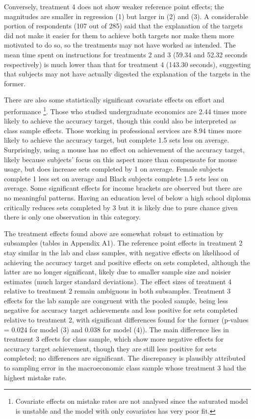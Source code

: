 \documentclass[
  12,
  letterpaper,
  DIV=11,
  numbers=noendperiod]{scrartcl}
\begin{document}
Conversely, treatment 4 does not show weaker reference point effects;
the magnitudes are smaller in regression (1) but larger in (2) and (3).
A considerable portion of respondents (107 out of 285) said that the
explanation of the targets did not make it easier for them to achieve
both targets nor make them more motivated to do so, so the treatments
may not have worked as intended. The mean time spent on instructions for
treatments 2 and 3 (59.34 and 52.32 seconds respectively) is much lower
than that for treatment 4 (143.30 seconds), suggesting that subjects may
not have actually digested the explanation of the targets in the former.

There are also some statistically significant covariate effects on
effort and performance \footnote{Covariate effects on mistake rates are
  not analysed since the saturated model is unstable and the model with
  only covariates has very poor fit.}. Those who studied undergraduate
economics are 2.44 times more likely to achieve the accuracy target,
though this could also be interpreted as class sample effects. Those
working in professional services are 8.94 times more likely to achieve
the accuracy target, but complete 1.5 sets less on average.
Surprisingly, using a mouse has no effect on achievement of the accuracy
target, likely because subjects' focus on this aspect more than
compensate for mouse usage, but does increase sets completed by 1 on
average. Female subjects complete 1 less set on average and Black
subjects complete 1.5 sets less on average. Some significant effects for
income brackets are observed but there are no meaningful patterns.
Having an education level of below a high school diploma critically
reduces sets completed by 3 but it is likely due to pure chance given
there is only one observation in this category.

The treatment effects found above are somewhat robust to estimation by
subsamples (tables in Appendix A1). The reference point effects in
treatment 2 stay similar in the lab and class samples, with negative
effects on likelihood of achieving the accuracy target and positive
effects on sets completed, although the latter are no longer
significant, likely due to smaller sample size and noisier estimates
(much larger standard deviations). The effect sizes of treatment 4
relative to treatment 2 remain ambiguous in both subsamples. Treatment 3
effects for the lab sample are congruent with the pooled sample, being
less negative for accuracy target achievements and less positive for
sets completed relative to treatment 2, with significant differences
found for the former (p-values = 0.024 for model (3) and 0.038 for model
(4)). The main difference lies in treatment 3 effects for class sample,
which show more negative effects for accuracy target achievement, though
they are still less positive for sets completed; no differences are
significant. The discrepancy is plausibly attributed to sampling error
in the macroeconomic class sample whose treatment 3 had the highest
mistake rate.
\end{document}
